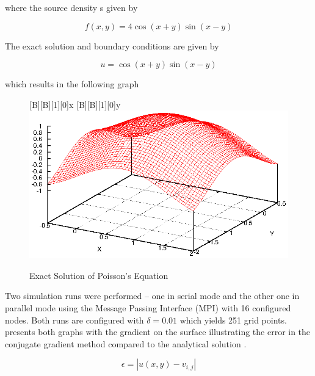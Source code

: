 \documentclass[12pt,a4paper]{report}
\begin{document}
where the source density s given by

\begin{equation}
  \label{eq:sourceDensity}
  f(x,y)=4\cos(x+y)\sin(x-y)
\end{equation}

The exact solution and boundary conditions are given by

\begin{equation}
  \label{eq:boundaryCond}
  u=\cos(x+y)\sin(x-y)
\end{equation}

which results in the following graph

\begin{figure}[htb]
  \centering
  [B][B][1][0]{x}
  [B][B][1][0]{y}
  \includegraphics[scale=0.5]{./images/exact.eps}
  \caption{Exact Solution of Poisson's Equation}
  \label{fig:exactPoiss}
\end{figure}

Two simulation runs were performed -- one in serial mode and the other
one in parallel mode using the Message Passing Interface (MPI) with 16
configured nodes. Both runs are configured with $\delta=0.01$ which
yields 251 grid points.  presents both
graphs with the gradient on the surface illustrating the error
 in the conjugate gradient method compared to the
analytical solution .

\begin{equation}
  \label{eq:error}
  \epsilon=|u(x,y)-v_{i,j}|
\end{equation}
\end{document}
